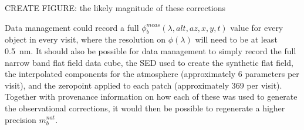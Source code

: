 \documentclass[12pt,preprint]{aastex}
\begin{document}
CREATE FIGURE: the likely magnitude of these corrections 

Data management could record a full
$\phi_b^{meas}(\lambda,alt,az,x,y,t)$ value for every object in every
visit, where the resolution on $\phi(\lambda)$ will need to be at
least 0.5~nm.  It should also be possible for data management to
simply record the full narrow band flat field data cube, the SED used
to create the synthetic flat field, the interpolated components for
the atmosphere (approximately 6 parameters per visit), and the
zeropoint applied to each patch (approximately 369 per
visit). Together with provenance information on how each of these was
used to generate the observational corrections, it would then be possible
to regenerate a higher precision $m_b^{nat}$.








\end{document}
